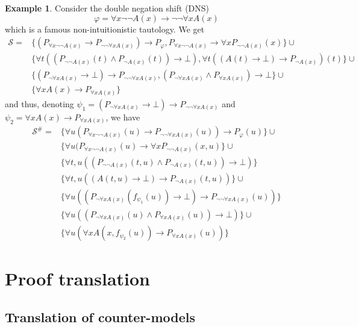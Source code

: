 \documentclass[a4paper,12pt]{report}
\theoremstyle{definition}
\theoremstyle{definition}
\theoremstyle{definition}
\theoremstyle{definition}
\theoremstyle{definition}
\theoremstyle{definition}
\newtheorem{example}[theorem]{Example}
\theoremstyle{definition}
\begin{document}
	\begin{example}
		Consider the double negation shift (DNS)
		$$\varphi = \forall x\neg\neg A(x)\to \neg\neg\forall x A(x)$$
		which is a famous non-intuitionistic tautology. We get
		\begin{align*}
			\mathcal S = & \{(P_{\forall x\neg\neg A(x)}\to P_{\neg\neg\forall xA(x)})\to P_\varphi, P_{\forall x\neg\neg A(x)}\to \forall xP_{\neg\neg A(x)}(x)\}\cup\\
			& \{\forall t((P_{\neg\neg A(x)}(t)\wedge P_{\neg A(x)}(t))\to \bot), \forall t((A(t)\to \bot)\to P_{\neg A(x)})(t)\}\cup\\
			& \{(P_{\neg\forall xA(x)}\to \bot)\to P_{\neg\neg\forall xA(x)}, (P_{\neg\forall xA(x)}\wedge P_{\forall xA(x)})\to \bot\}\cup\\
			&\{\forall xA(x)\to P_{\forall xA(x)}\}
		\end{align*}
		and thus, denoting $\psi_1 = (P_{\neg\forall xA(x)}\to \bot)\to P_{\neg\neg\forall xA(x)}$ and $\psi_2 = \forall xA(x)\to P_{\forall xA(x)}$, we have
		\begin{align*}
			\mathcal S^\# = & \{\forall u(P_{\forall x\neg\neg A(x)}(u)\to P_{\neg\neg\forall xA(x)}(u))\to P_\varphi(u)\}\cup\\& \{\forall u(P_{\forall x\neg\neg A(x)}(u)\to \forall xP_{\neg\neg A(x)}(x, u)\}\cup\\
			& \{\forall t, u((P_{\neg\neg A(x)}(t, u)\wedge P_{\neg A(x)}(t, u))\to \bot)\}\\& \{\forall t, u((A(t, u)\to \bot)\to P_{\neg A(x)}(t, u))\}\cup\\
			& \{\forall u((P_{\neg\forall xA(x)}(f_{\psi_1}(u))\to \bot)\to P_{\neg\neg\forall xA(x)}(u))\}\\& \{\forall u((P_{\neg\forall xA(x)}(u)\wedge P_{\forall xA(x)}(u))\to \bot)\}\cup\\
			&\{\forall u(\forall xA(x, f_{\psi_2}(u))\to P_{\forall xA(x)}(u))\}
		\end{align*}
	\end{example}
	
	
	\chapter{Proof translation}

	
	\section{Translation of counter-models}
	
\end{document}
